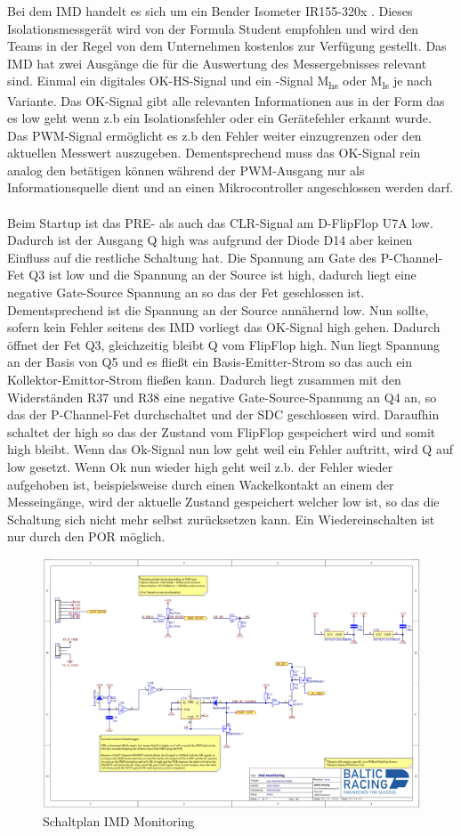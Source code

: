 Bei dem \ac{IMD} handelt es sich um ein Bender Isometer IR155-320x \cite{ISOMETERIR155-3203/IR155-3204}. Dieses Isolationsmessgerät wird von der Formula Student empfohlen und wird den Teams in der Regel von dem Unternehmen kostenlos zur Verfügung gestellt.
Das \ac{IMD} hat zwei Ausgänge die für die Auswertung des Messergebnisses relevant sind. Einmal ein digitales OK-HS-Signal und ein -Signal M\textsubscript{hs} oder M\textsubscript{ls} je nach Variante. Das OK-Signal gibt alle relevanten Informationen aus in der Form das es low geht wenn z.b ein Isolationsfehler oder ein Gerätefehler erkannt wurde. Das \ac{PWM}-Signal ermöglicht es z.b den Fehler weiter einzugrenzen oder den aktuellen Messwert auszugeben. Dementsprechend muss das OK-Signal rein analog den  betätigen können während der \ac{PWM}-Ausgang nur als Informationsquelle  dient und an einen Mikrocontroller angeschlossen werden darf. 
\\
\\
Beim Startup ist das PRE- als auch das CLR-Signal am D-FlipFlop U7A low. Dadurch ist der Ausgang Q high was aufgrund der Diode D14 aber keinen Einfluss auf die restliche Schaltung hat. Die Spannung am Gate des P-Channel-Fet Q3 ist low und die Spannung an der Source ist high, dadurch liegt eine negative Gate-Source Spannung an so das der Fet geschlossen ist. Dementsprechend ist die Spannung an der Source annähernd low. Nun sollte, sofern kein Fehler seitens des \ac{IMD} vorliegt das OK-Signal high gehen. Dadurch öffnet der Fet Q3, gleichzeitig bleibt Q vom FlipFlop high. Nun liegt Spannung an der Basis von Q5 und es fließt ein Basis-Emitter-Strom so das auch ein Kollektor-Emittor-Strom fließen kann. Dadurch liegt zusammen mit den Widerständen R37 und R38 eine negative Gate-Source-Spannung an Q4 an, so das der P-Channel-Fet durchschaltet und der \ac{SDC} geschlossen wird. Daraufhin schaltet der  high so das der Zustand vom FlipFlop gespeichert wird und somit high bleibt. Wenn das Ok-Signal nun low geht weil ein Fehler auftritt, wird Q auf low gesetzt. Wenn Ok nun wieder high geht weil z.b. der Fehler wieder aufgehoben ist, beispielsweise durch einen Wackelkontakt an einem der Messeingänge, wird der aktuelle Zustand gespeichert welcher low ist, so das die Schaltung sich nicht mehr selbst zurücksetzen kann. Ein Wiedereinschalten ist nur durch den \ac{POR} möglich.

\begin{figure}
	\centering
	\includegraphics[width=0.7\linewidth]{"bilder/IMD Monitoring schematic"}
	\caption{Schaltplan IMD Monitoring}
	\label{fig:imd-monitoring-schematic}
\end{figure}


